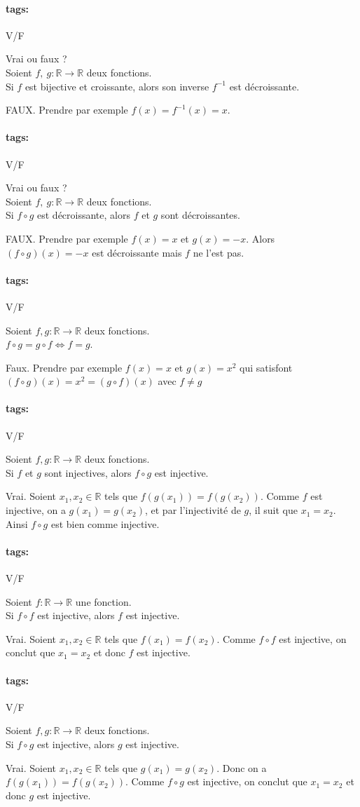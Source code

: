 \documentclass[12pt]{article}
\newcommand*{\xfield}[1]{\begin{mdframed}\centering #1\end{mdframed}\bigskip}
\newenvironment{note}{}{}
\newcommand*{\tags}[1]{\paragraph{tags: }#1}
\begin{document}
\begin{note}
\tags{V/F}
	\xfield{Vrai ou faux ?\\
	Soient $f,\ g : \mathbb{R} \to \mathbb{R}$ deux fonctions.\\
	Si $f$ est bijective et croissante, alors son inverse $f^{-1}$ est décroissante.}
	\xfield{FAUX.
Prendre par exemple $f(x) = f^{-1} (x) = x$.}
\end{note}

\begin{note}
\tags{V/F}
	\xfield{Vrai ou faux ?\\
	Soient $f,\ g : \mathbb{R} \to \mathbb{R}$ deux fonctions.\\
	Si $f\circ g$ est décroissante, alors $f$ et $g$ sont décroissantes.}
	\xfield{FAUX.
Prendre par exemple $f(x) = x$ et $g(x) = -x$. Alors $(f\circ g)(x) = -x$ est décroissante
mais $f$ ne l’est pas.}
\end{note}




\begin{note}
\tags{V/F}
	\xfield{Soient $f, g : \mathbb{R} \to \mathbb{R}$ deux fonctions.\\
	$f \circ g = g \circ f \Leftrightarrow f = g$.}
	\xfield{Faux. Prendre par exemple $f(x) = x$ et $g(x) = x^2$ qui satisfont $(f \circ g)(x) = x^2 = (g \circ f)(x)$ avec $f\neq g$}
\end{note}

\begin{note}
\tags{V/F}
	\xfield{Soient $f, g : \mathbb{R} \to \mathbb{R}$ deux fonctions.\\
	Si $f$ et $g$ sont injectives, alors $f \circ g$ est injective.}
	\xfield{Vrai. Soient $x_1,x_2 \in \mathbb{R}$ tels que $f(g(x_1))=f(g(x_2))$. Comme $f$ est injective, on a $g(x_1) = g(x_2)$, et par l'injectivité de $g$, il suit que $x_1 = x_2$. Ainsi $f \circ g$ est bien comme injective.}
\end{note}

\begin{note}
\tags{V/F}
	\xfield{Soient $f: \mathbb{R} \to \mathbb{R}$ une fonction.\\
	Si $f \circ f$ est injective, alors $f$ est injective.}
	\xfield{Vrai. Soient $x_1,x_2 \in \mathbb{R}$ tels que $f(x_1)=f(x_2)$. Comme $f \circ f$ est injective, on conclut que $x_1=x_2$ et donc $f$ est injective.}
\end{note}

\begin{note}
\tags{V/F}
	\xfield{Soient $f, g : \mathbb{R} \to \mathbb{R}$ deux fonctions.\\
	Si $f \circ g$ est injective, alors $g$ est injective.}
	\xfield{Vrai. Soient $x_1,x_2 \in \mathbb{R}$ tels que $g(x_1)=g(x_2)$. Donc on a $f(g(x_1))=f(g(x_2))$. Comme $f \circ g$ est injective, on conclut que $x_1=x_2$ et donc $g$ est injective.}
\end{note}
\end{document}
